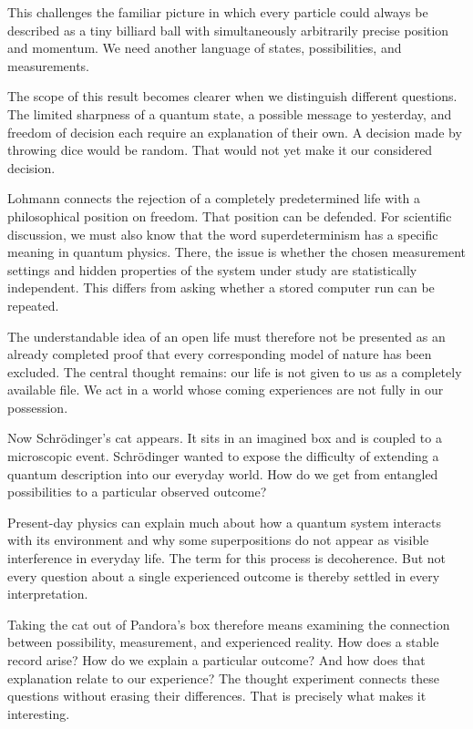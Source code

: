 This challenges the familiar picture in which every particle could always be described as a tiny billiard ball with simultaneously arbitrarily precise position and momentum. We need another language of states, possibilities, and measurements.

The scope of this result becomes clearer when we distinguish different questions. The limited sharpness of a quantum state, a possible message to yesterday, and freedom of decision each require an explanation of their own. A decision made by throwing dice would be random. That would not yet make it our considered decision.

Lohmann connects the rejection of a completely predetermined life with a philosophical position on freedom. That position can be defended. For scientific discussion, we must also know that the word superdeterminism has a specific meaning in quantum physics. There, the issue is whether the chosen measurement settings and hidden properties of the system under study are statistically independent. This differs from asking whether a stored computer run can be repeated.

The understandable idea of an open life must therefore not be presented as an already completed proof that every corresponding model of nature has been excluded. The central thought remains: our life is not given to us as a completely available file. We act in a world whose coming experiences are not fully in our possession.

Now Schrödinger's cat appears. It sits in an imagined box and is coupled to a microscopic event. Schrödinger wanted to expose the difficulty of extending a quantum description into our everyday world. How do we get from entangled possibilities to a particular observed outcome?

Present-day physics can explain much about how a quantum system interacts with its environment and why some superpositions do not appear as visible interference in everyday life. The term for this process is decoherence. But not every question about a single experienced outcome is thereby settled in every interpretation.

Taking the cat out of Pandora's box therefore means examining the connection between possibility, measurement, and experienced reality. How does a stable record arise? How do we explain a particular outcome? And how does that explanation relate to our experience? The thought experiment connects these questions without erasing their differences. That is precisely what makes it interesting.

